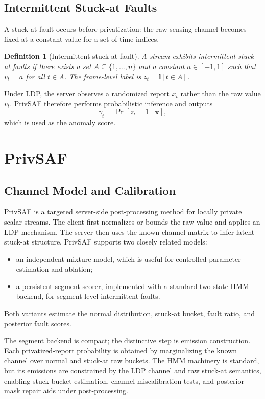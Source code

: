 \documentclass[conference]{IEEEtran}
\newtheorem{definition}{Definition}
\begin{document}
\subsection{Intermittent Stuck-at Faults}
\label{sec:faultmodel}

A stuck-at fault occurs before privatization: the raw sensing channel becomes fixed at a constant value for a set of time indices.

\begin{definition}[Intermittent stuck-at fault]
A stream exhibits intermittent stuck-at faults if there exists a set \(A\subseteq\{1,\ldots,n\}\) and a constant \(a\in[-1,1]\) such that \(v_t=a\) for all \(t\in A\). The frame-level label is \(z_t=\mathbb{I}[t\in A]\).
\end{definition}

Under LDP, the server observes a randomized report \(x_t\) rather than the raw value \(v_t\). PrivSAF therefore performs probabilistic inference and outputs
\[
\gamma_t=\Pr[z_t=1\mid \mathbf{x}],
\]
which is used as the anomaly score.

\section{PrivSAF}
\label{sec:method}

\subsection{Channel Model and Calibration}
\label{sec:method_overview}

PrivSAF is a targeted server-side post-processing method for locally private scalar streams. The client first normalizes or bounds the raw value and applies an LDP mechanism. The server then uses the known channel matrix to infer latent stuck-at structure. PrivSAF supports two closely related models:
\begin{itemize}
    \item an independent mixture model, which is useful for controlled parameter estimation and ablation;
    \item a persistent segment scorer, implemented with a standard two-state HMM backend, for segment-level intermittent faults.
\end{itemize}
Both variants estimate the normal distribution, stuck-at bucket, fault ratio, and posterior fault scores.

The segment backend is compact; the distinctive step is emission construction. Each privatized-report probability is obtained by marginalizing the known channel over normal and stuck-at raw buckets. The HMM machinery is standard, but its emissions are constrained by the LDP channel and raw stuck-at semantics, enabling stuck-bucket estimation, channel-miscalibration tests, and posterior-mask repair aids under post-processing.
\end{document}
